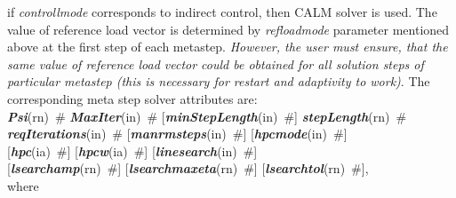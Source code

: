 \documentclass[draft]{article}
\newcommand{\param}[1]{{\em #1}}
\newcommand{\keywordnotype}[1]{\mbox{{\it{\bf{#1}}}}}
\newcommand{\keyword}[2]{\mbox{{\keywordnotype{#1}\tiny (#2)}}}
\newcommand{\field}[2]{\mbox{\keyword{#1}{#2}~\#}}
\newcommand{\optField}[2]{\mbox{[\field{#1}{#2}]}}
\begin{document}
if \param{controllmode} corresponds to indirect control, then CALM
solver is used. The value of reference load vector is determined by
\param{refloadmode} parameter mentioned above at the first step of
each metastep. {\em However, the user must ensure, that the same value of
reference load vector could be obtained for all solution steps of
particular metastep (this is necessary for restart and adaptivity to work)}.
The corresponding meta step solver
attributes are:\\
\field{Psi}{rn} \field{MaxIter}{in} \optField{min\-Step\-Le\-ngth}{in}
\field{stepLength}{rn}\\ \field{reqIterations}{in}
\optField{manrmsteps}{in} \optField{hpcmode}{in}\\ \optField{hpc}{ia}
\optField{hpcw}{ia} \optField{linesearch}{in}\\
\optField{lsearchamp}{rn} \optField{lsearchmaxeta}{rn} \optField{lsearchtol}{rn},\\where
\end{document}

